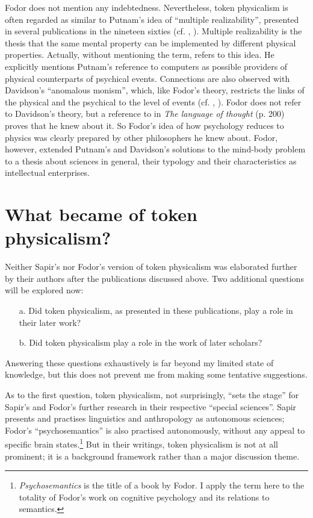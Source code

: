 \documentclass[output=paper]{langscibook}
\begin{document}
Fodor does not mention any indebtedness. Nevertheless, token physicalism is often regarded as similar to Putnam's idea of ``multiple realizability'', presented in several publications in the nineteen sixties (cf. \citealt{Putnam1960}, \citealt[xiii]{LoewerRey1991}). Multiple realizability is the thesis that the same mental property can be implemented by different physical properties. Actually, without mentioning the term, \citet[105--106]{Fodor1974} refers to this idea. He explicitly mentions Putnam's reference to computers as possible providers of physical counterparts of psychical events. Connections are also observed with Davidson's ``anomalous monism'', which, like Fodor's theory, restricts the links of the physical and the psychical to the level of events (cf. \citealt{Davidson1970}, \citealt[xxxi]{LoewerRey1991}). Fodor does not refer to Davidson's theory, but a reference to \citet{Davidson1970} in \emph{The language of thought} (p. 200) proves that he knew about it. So Fodor's idea of how psychology reduces to physics was clearly prepared by other philosophers he knew about. Fodor, however, extended Putnam's and Davidson's solutions to the mind-body problem to a thesis about sciences in general, their typology and their characteristics as intellectual enterprises.

\section{What became of token physicalism?}
\label{sec:elffers:whatbecame}

Neither Sapir's nor Fodor's version of token physicalism was elaborated further by their authors after the publications discussed above. Two additional questions will be explored now:

\begin{enumerate}
    \item[a.] Did token physicalism, as presented in these publications, play a role in their later work?
    \item[b.] Did token physicalism play a role in the work of later scholars?
\end{enumerate}

Answering these questions exhaustively is far beyond my limited state of knowledge, but this does not prevent me from making some tentative suggestions.

As to the first question, token physicalism, not surprisingly, ``sets the stage'' for Sapir's and Fodor's further research in their respective ``special sciences''. Sapir presents and practises linguistics and anthropology as autonomous sciences; Fodor's ``psychosemantics'' is also practised autonomously, without any appeal to specific brain states.\footnote{\emph{Psychosemantics} is the title of a \citeyear{Fodor1987} book by Fodor. I apply the term here to the totality of Fodor's work on cognitive psychology and its relations to semantics.} But in their writings, token physicalism is not at all prominent; it is a background framework rather than a major discussion theme.
\end{document}
